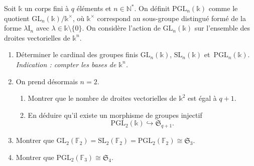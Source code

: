 \documentclass[./main]{subfiles}
\begin{document}
  \begin{enonce}
    Soit $\mathds{k}$ un corps fini à $q$ éléments et $n \in \mathds{N}^*$.
    On définit $\mathrm{PGL}_n(\mathds{k})$ comme le quotient $\mathrm{GL}_n(\mathds{k}) / \mathds{k}^\times$, où $\mathds{k}^\times$  correspond au sous-groupe distingué formé de la forme $\lambda \mathrm{I}_n$ avec $\lambda \in \mathds{k} \setminus \{0\}$.
    On considère l'action de $\mathrm{GL}_n(\mathds{k})$ sur l'ensemble des droites vectorielles de $\mathds{k}^n$.
    \begin{enumerate}
      \item Déterminer le cardinal des groupes finis $\mathrm{GL}_n(\mathds{k})$, $\mathrm{SL}_n(\mathds{k})$ et~$\mathrm{PGL}_n(\mathds{k})$.
        \textit{Indication : compter les bases de $\mathds{k}^n$.}
      \item On prend désormais $n = 2$.
        \begin{enumerate}
          \item Montrer que le nombre de droites vectorielles de $\mathds{k}^2$ est égal à $q + 1$.
        \item En déduire qu'il existe un morphisme de groupes injectif \[\mathrm{PGL}_2(\mathds{k}) \hookrightarrow \mathfrak{S}_{q+1}. \]
        \end{enumerate}
      \item Montrer que $\mathrm{GL}_2(\mathds{F}_2) = \mathrm{SL}_2(\mathds{F}_2) = \mathrm{PGL}_2(\mathds{F}_2) \cong \mathfrak{S}_3$.
      \item Montrer que $\mathrm{PGL}_2(\mathds{F}_3) \cong \mathfrak{S}_4$.
    \end{enumerate}
  \end{enonce}
\end{document}

